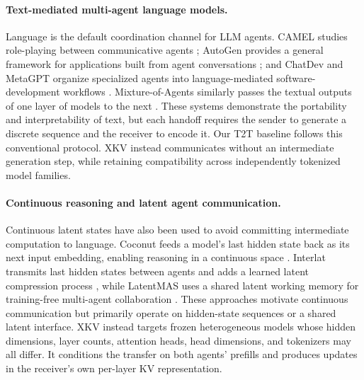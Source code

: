 \documentclass[11pt]{article}
\newcommand{\xkv}{\textsc{XKV}\xspace}
\newcommand{\ttoT}{\textsc{T2T}\xspace}
\begin{document}
\paragraph{Text-mediated multi-agent language models.}
Language is the default coordination channel for LLM agents. CAMEL studies
role-playing between communicative agents \cite{li2023camel}; AutoGen provides a
general framework for applications built from agent conversations
\cite{wu2023autogen}; and ChatDev and MetaGPT organize specialized agents into
language-mediated software-development workflows
\cite{qian2023chatdev,hong2023metagpt}. Mixture-of-Agents similarly passes the
textual outputs of one layer of models to the next \cite{wang2024mixture}.
These systems demonstrate the portability and interpretability of text, but
each handoff requires the sender to generate a discrete sequence and the
receiver to encode it. Our \ttoT baseline follows this conventional protocol.
\xkv instead communicates without an intermediate generation step, while
retaining compatibility across independently tokenized model families.

\paragraph{Continuous reasoning and latent agent communication.}
Continuous latent states have also been used to avoid committing intermediate
computation to language. Coconut feeds a model's last hidden state back as its
next input embedding, enabling reasoning in a continuous space
\cite{hao2024coconut}. Interlat transmits last hidden states between agents and
adds a learned latent compression process \cite{du2025interlat}, while LatentMAS
uses a shared latent working memory for training-free multi-agent collaboration
\cite{zou2025latentmas}. These approaches motivate continuous communication but
primarily operate on hidden-state sequences or a shared latent interface. \xkv
instead targets frozen heterogeneous models whose hidden dimensions, layer
counts, attention heads, head dimensions, and tokenizers may all differ. It
conditions the transfer on both agents' prefills and produces updates in the
receiver's own per-layer KV representation.
\end{document}
